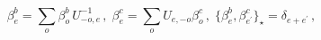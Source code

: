 \begin{equation}
\beta _{e}^{b}=\sum_{o}\beta _{o}^{b}\,U_{-o,e}^{-1}\,,\;\beta
_{e}^{c}=\sum_{o}U_{e,-o}\beta _{o}^{c}\,,\;\{\beta _{e}^{b},\beta
_{e^{\prime }}^{c}\}_{\star }=\delta _{e+e^{\prime }}\,,  \label{even_fields}
\end{equation}

